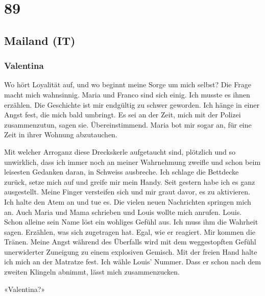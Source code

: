 \chapter{89}

\section[Mailand (IT), Mittwoch, 5. September]{Mailand (IT)}

\subsection{Valentina}

Wo hört Loyalität auf, und wo beginnt meine Sorge um mich selbst?
Die Frage macht mich wahnsinnig. Maria und Franco sind sich einig. Ich
musste es ihnen erzählen. Die Geschichte ist mir endgültig zu schwer
geworden. Ich hänge in einer Angst fest, die mich bald umbringt. Es sei
an der Zeit, mich mit der Polizei zusammenzutun, sagen sie.
Übereinstimmend. Maria bot mir sogar an, für eine Zeit in ihrer Wohnung
abzutauchen.

Mit welcher Arroganz diese Dreckskerle aufgetaucht sind, plötzlich und
so unwirklich, dass ich immer noch an meiner Wahrnehmung zweifle und
schon beim leisesten Gedanken daran, in Schweiss ausbreche.
Ich schlage die Bettdecke zurück, setze mich auf und greife mir mein
Handy. Seit gestern habe ich es ganz ausgestellt. Meine Finger versteifen sich
und mir graut davor, es zu aktivieren. Ich halte den Atem an und tue es.
Die vielen neuen Nachrichten springen mich an. Auch Maria und Mama
schrieben und Louis wollte mich anrufen. Louis. Schon alleine sein Name
löst ein wohliges Gefühl aus. Ich muss ihm die Wahrheit sagen. Erzählen, was sich
zugetragen hat. Egal, wie er reagiert. Mir kommen die Tränen. Meine
Angst während des Überfalls wird mit dem weggestopften Gefühl
unerwiderter Zuneigung zu einem explosiven Gemisch. Mit der freien Hand
halte ich mich an der Matratze fest. Ich wähle Louis’ Nummer.
Dass er schon nach dem zweiten Klingeln abnimmt, lässt mich zusammenzucken.

«Valentina?»
